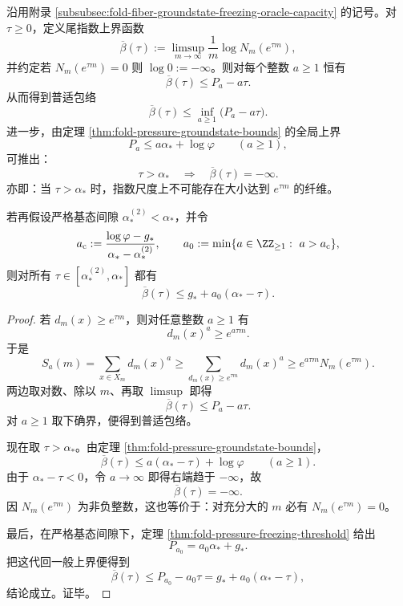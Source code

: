 

\begin{theorem}[尾指数的普适压力包络与超最大纤维的指数排除]\label{thm:xi-tail-exponent-pressure-envelope-no-supermax}
沿用附录 \ref{subsubsec:fold-fiber-groundstate-freezing-oracle-capacity} 的记号。对 \(\tau\ge 0\)，定义尾指数上界函数
\[
\overline\beta(\tau):=
\limsup_{m\to\infty}\frac{1}{m}\log N_m(e^{\tau m}),
\]
并约定若 \(N_m(e^{\tau m})=0\) 则 \(\log 0:=-\infty\)。则对每个整数 \(a\ge 1\) 恒有
\[
\boxed{\;
\overline\beta(\tau)\le P_a-a\tau.\;}
\]
从而得到普适包络
\[
\boxed{\;
\overline\beta(\tau)\le \inf_{a\ge 1}\bigl(P_a-a\tau\bigr).\;}
\]
进一步，由定理 \ref{thm:fold-pressure-groundstate-bounds} 的全局上界
\[
P_a\le a\alpha_*+\log\varphi
\qquad(a\ge 1),
\]
可推出：
\[
\boxed{\;
\tau>\alpha_*
\quad\Longrightarrow\quad
\overline\beta(\tau)=-\infty.\;}
\]
亦即：当 \(\tau>\alpha_*\) 时，指数尺度上不可能存在大小达到 \(e^{\tau m}\) 的纤维。
\par
若再假设严格基态间隙 \(\alpha_*^{(2)}<\alpha_*\)，并令
\[
a_{\mathrm c}:=\frac{\log\varphi-g_*}{\alpha_*-\alpha_*^{(2)}},
\qquad
a_0:=\min\{a\in\ZZ_{\ge 1}:\ a>a_{\mathrm c}\},
\]
则对所有 \(\tau\in[\alpha_*^{(2)},\alpha_*]\) 都有
\[
\boxed{\;
\overline\beta(\tau)\le g_*+a_0(\alpha_*-\tau).\;}
\]
\end{theorem}
\begin{proof}
若 \(d_m(x)\ge e^{\tau m}\)，则对任意整数 \(a\ge 1\) 有
\[
d_m(x)^a\ge e^{a\tau m}.
\]
于是
\[
S_a(m)=\sum_{x\in X_m}d_m(x)^a
\ge
\sum_{d_m(x)\ge e^{\tau m}}d_m(x)^a
\ge
e^{a\tau m}N_m(e^{\tau m}).
\]
两边取对数、除以 \(m\)、再取 \(\limsup\) 即得
\[
\overline\beta(\tau)\le P_a-a\tau.
\]
对 \(a\ge 1\) 取下确界，便得到普适包络。
\par
现在取 \(\tau>\alpha_*\)。由定理 \ref{thm:fold-pressure-groundstate-bounds}，
\[
\overline\beta(\tau)\le a(\alpha_*-\tau)+\log\varphi
\qquad(a\ge 1).
\]
由于 \(\alpha_*-\tau<0\)，令 \(a\to\infty\) 即得右端趋于 \(-\infty\)，故
\[
\overline\beta(\tau)=-\infty.
\]
因 \(N_m(e^{\tau m})\) 为非负整数，这也等价于：对充分大的 \(m\) 必有 \(N_m(e^{\tau m})=0\)。
\par
最后，在严格基态间隙下，定理 \ref{thm:fold-pressure-freezing-threshold} 给出
\[
P_{a_0}=a_0\alpha_*+g_*.
\]
把这代回一般上界便得到
\[
\overline\beta(\tau)\le P_{a_0}-a_0\tau=g_*+a_0(\alpha_*-\tau),
\]
结论成立。证毕。
\end{proof}

